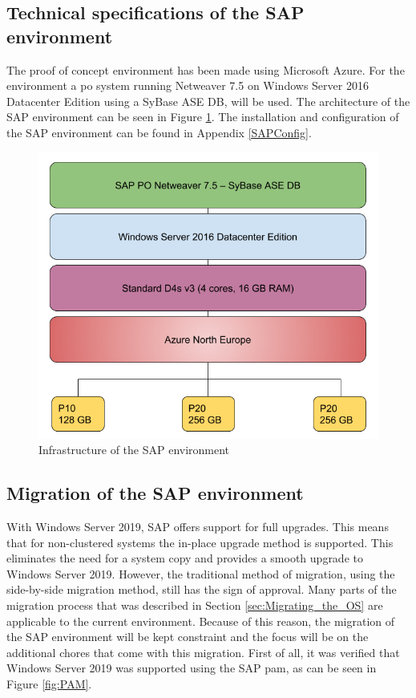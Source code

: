 \subsection{Technical specifications of the SAP environment}
The proof of concept environment has been made using Microsoft Azure. 
For the environment a \acrfull{po} system running Netweaver 7.5 on Windows Server 2016 Datacenter Edition using a SyBase ASE DB, will be used. 
The architecture of the SAP environment can be seen in Figure \ref{fig:SAPInfra}.
The installation and configuration of the SAP environment can be found in Appendix \ref{SAPConfig}.

\begin{figure}[h]
	\captionsetup{width=0.8\linewidth}
	\includegraphics[width=0.9\linewidth]{img/Methodologie/SAP_PO.png}
	\centering
	\caption[SAP Infrastructure]{Infrastructure of the SAP environment}
	\label{fig:SAPInfra}	
\end{figure}

\subsection{Migration of the SAP environment}
With Windows Server 2019, SAP offers support for full upgrades. 
This means that for non-clustered systems the in-place upgrade method is supported.
This eliminates the need for a system copy and provides a smooth upgrade to Windows Server 2019. 
However, the traditional method of migration, using the side-by-side migration method, still has the sign of approval. 
Many parts of the migration process that was described in Section \ref{sec:Migrating_the_OS} are applicable to the current environment. 
Because of this reason, the migration of the SAP environment will be kept constraint and the focus will be on the additional chores that come with this migration.
First of all, it was verified that Windows Server 2019 was supported using the SAP \acrshort{pam}, as can be seen in Figure \ref{fig:PAM}.

